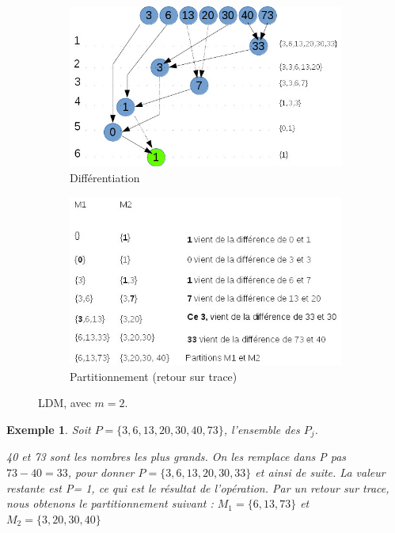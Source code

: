 \documentclass[a4paper,12pt]{report}
\theoremstyle{plain}				%
\newtheorem{example}{Exemple}
\theoremstyle{definition}				%
\begin{document}
\begin{itemize}
\begin{figure}[h!]
{\centering}
	\begin{subfigure}[b]{0.45\linewidth}
    \includegraphics[width=\linewidth]
    {Biblio_PCmax_Rendu_exLDM_1_2m.jpg}
    \caption{Différentiation}
  	\end{subfigure}
\hfill%
	\begin{subfigure}[b]{0.45\linewidth}
    \includegraphics[width=\linewidth]
    {Biblio_PCmax_Rendu_exLDM_2_2m.jpg}
    \caption{Partitionnement (retour sur trace)}
  	\end{subfigure}
  	\caption{LDM, avec $m=2$.}
  	\label{fig:LDM2M}
\end{figure}

 \begin{example}
Soit $P=\{3,6,13,20,30,40,73\}$, l'ensemble des $P_j$.
 
40 et 73 sont les nombres les plus grands. On les remplace dans P pas $73 - 40 = 33$, pour donner $P=\{3,6,13,20,30,33\}$ et ainsi de suite.
La valeur restante est P= {1}, ce qui est le résultat de l'opération.
Par un retour sur trace, nous obtenons le partitionnement suivant :
$M_1 = \{ 6,13,73 \}$ et  $M_2 = \{ 3,20,30,40 \}$ 


\end{example}
\end{itemize}
\end{document}
